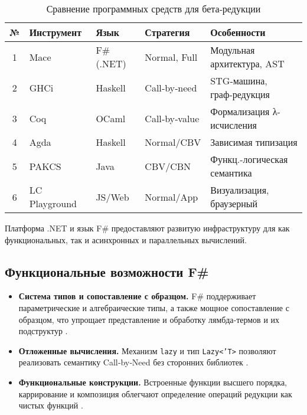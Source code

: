 \begin{table}[h]
\caption{Сравнение программных средств для бета‑редукции}
\label{tbl:cmp-tools-beta}
\centering
\small
\begin{tabular}{|c|l|l|l|l|}
\hline
№ & Инструмент & Язык & Стратегия & Особенности \\
\hline
1 & Mace & F\# (.NET) & Normal, Full & Модульная архитектура, AST \\
2 & GHCi & Haskell & Call‑by‑need & STG‑машина, граф‑редукция \\
3 & Coq & OCaml & Call‑by‑value & Формализация λ-исчисления \\
4 & Agda & Haskell & Normal/CBV & Зависимая типизация \\
5 & PAKCS & Java & CBV/CBN & Функц.-логическая семантика \\
6 & LC Playground & JS/Web & Normal/App & Визуализация, браузерный \\
\hline
\end{tabular}
\end{table}
Платформа .NET и язык F\# предоставляют развитую инфраструктуру для как функциональных, так и асинхронных и параллельных вычислений.

\subsection{Функциональные возможности F\#}
\begin{itemize}
  \item \textbf{Система типов и сопоставление с образцом.} F\# поддерживает параметрические и алгебраические типы, а также мощное сопоставление с образцом, что упрощает представление и обработку лямбда‑термов и их подструктур \cite{Syme2015}.
  \item \textbf{Отложенные вычисления.} Механизм \texttt{lazy} и тип \texttt{Lazy<'T>} позволяют реализовать семантику Call‑by‑Need без сторонних библиотек \cite{Syme2015}.
  \item \textbf{Функциональные конструкции.} Встроенные функции высшего порядка, каррирование и композиция облегчают определение операций редукции как чистых функций \cite{Syme2015}.
\end{itemize}

